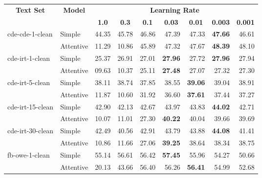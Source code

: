 \begin{tabular}{| l | l | r | r | r | r | r | r | r |}
    \hline

    \multicolumn{1}{|c|}{\multirow{2}{*}{\textbf{Text Set}}} &
    \multicolumn{1}{|c|}{\multirow{2}{*}{\textbf{Model}}} &
    \multicolumn{7}{|c|}{\textbf{Learning Rate}} \\

    &
    &
    \multicolumn{1}{|c|}{\textbf{1.0}} &
    \multicolumn{1}{|c|}{\textbf{0.3}} &
    \multicolumn{1}{|c|}{\textbf{0.1}} &
    \multicolumn{1}{|c|}{\textbf{0.03}} &
    \multicolumn{1}{|c|}{\textbf{0.01}} &
    \multicolumn{1}{|c|}{\textbf{0.003}} &
    \multicolumn{1}{|c|}{\textbf{0.001}} \\

    \hline \hline

    \multirow{2}{*}{cde-cde-1-clean}
    & Simple    & 44.35 & 45.78 & 46.86 & 47.39 & 47.33 & \textbf{47.66} & 46.61 \\
    & Attentive & 11.29 & 10.86 & 45.89 & 47.32 & 47.67 & \textbf{48.39} & 48.10 \\ \hline

    \multirow{2}{*}{cde-irt-1-clean}
    & Simple    & 25.37 & 26.91 & 27.01 & \textbf{27.96} & 27.72 & \textbf{27.96} & 27.94 \\
    & Attentive & 09.63 & 10.37 & 25.11 & \textbf{27.48} & 27.07 & 27.32 & 27.30 \\ \hline

    \multirow{2}{*}{cde-irt-5-clean}
    & Simple    & 38.11 & 38.74 & 37.85 & 38.55 & \textbf{39.06} & 39.04 & 38.91 \\
    & Attentive & 11.87 & 10.60 & 31.92 & 36.60 & \textbf{37.61} & 37.44 & 37.27 \\ \hline

    \multirow{2}{*}{cde-irt-15-clean}
    & Simple    & 42.90 & 42.13 & 42.67 & 43.97 & 43.83 & \textbf{44.02} & 42.71 \\
    & Attentive & 10.07 & 11.01 & 27.30 & \textbf{40.22} & 40.04 & 39.66 & 39.69 \\ \hline

    \multirow{2}{*}{cde-irt-30-clean}
    & Simple    & 42.49 & 40.56 & 42.91 & 43.79 & 43.88 & \textbf{44.08} & 41.41 \\
    & Attentive & 10.86 & 11.66 & 27.06 & \textbf{39.25} & 38.64 & 38.34 & 38.75 \\ \hline \hline

    \multirow{2}{*}{fb-owe-1-clean}
    & Simple    & 55.14 & 56.61 & 56.42 & \textbf{57.45} & 55.96 & 54.27 & 50.66 \\
    & Attentive & 20.13 & 43.66 & 56.40 & 56.26 & \textbf{56.41} & 54.99 & 52.68 \\ \hline


\end{tabular}
